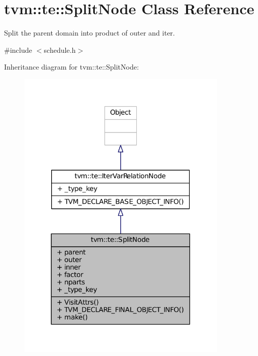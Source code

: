 \hypertarget{classtvm_1_1te_1_1SplitNode}{}\section{tvm\+:\+:te\+:\+:Split\+Node Class Reference}
\label{classtvm_1_1te_1_1SplitNode}


Split the parent domain into product of outer and iter.  




{\ttfamily \#include $<$schedule.\+h$>$}



Inheritance diagram for tvm\+:\+:te\+:\+:Split\+Node\+:
\nopagebreak
\begin{figure}[H]
\begin{center}
\leavevmode
\includegraphics[width=285pt]{classtvm_1_1te_1_1SplitNode__inherit__graph}
\end{center}
\end{figure}


